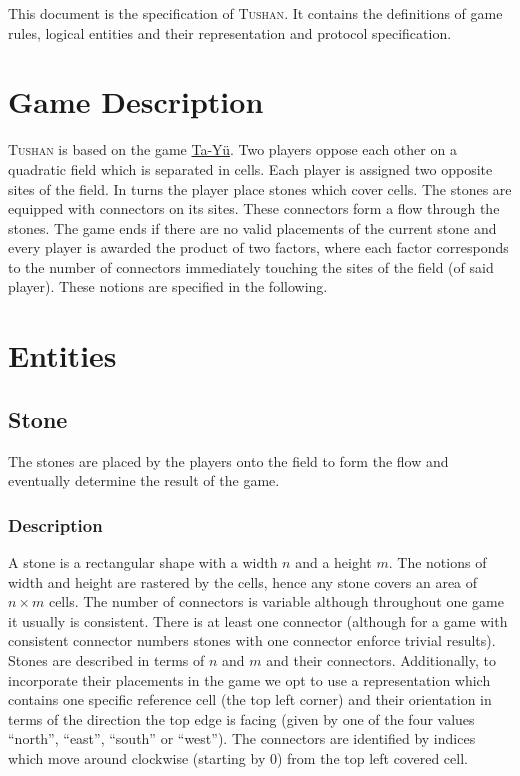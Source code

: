 \documentclass{scrartcl}
\newcommand{\tushan}{\textsc{Tushan}}
\begin{document}
This document is the specification of \tushan{}. It contains the 
definitions of game rules, logical entities and their representation and 
protocol specification.

\section{Game Description}
\tushan{} is based on the game 
\href{https://en.wikipedia.org/wiki/Ta\_Y\%C3\%BC}{Ta-Yü}. Two players
oppose each other on a quadratic field which is separated in cells. Each player 
is assigned two opposite sites of the field. In turns the player place stones
which cover cells. The stones are equipped with connectors on its sites. These
connectors form a flow through the stones. The game ends if there are no valid
placements of the current stone and every player is awarded the product of two
factors, where each factor corresponds to the number of connectors immediately
touching the sites of the field (of said player). These notions are specified
in the following.

\section{Entities}
\subsection{Stone}
The stones are placed by the players onto the field to form the flow and 
eventually determine the result of the game.
\subsubsection{Description}
A stone is a rectangular shape with a width $n$ and a height $m$. The notions 
of width and height are rastered by the cells, hence any stone covers an area
of $n\times m$ cells. The number of connectors is variable although throughout 
one game it usually is consistent. There is at least one connector (although 
for a game with consistent connector numbers stones with one connector enforce 
trivial results). Stones are described in terms of $n$ and $m$ and their 
connectors. Additionally, to incorporate their placements in the game we opt to 
use a representation which contains one specific reference cell (the top left
corner) and their orientation in terms of the direction the top edge is facing
(given by one of the four values \enquote{north}, \enquote{east}, 
\enquote{south} or \enquote{west}). The connectors are identified by indices 
which move around clockwise (starting by $0$) from the top left covered cell.
\end{document}
